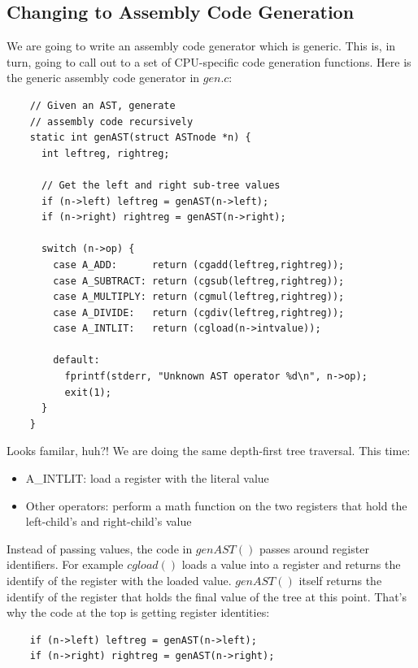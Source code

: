 \documentclass[journal, onecolumn, 12pt]{IEEEtran}
\begin{document}
\subsection{Changing to Assembly Code Generation}

We are going to write an assembly code generator which is generic. This is, in turn, going to call out to a set of CPU-specific code generation functions. Here is the generic assembly code generator in $gen.c$:

\begin{lstlisting}
    // Given an AST, generate
    // assembly code recursively
    static int genAST(struct ASTnode *n) {
      int leftreg, rightreg;
    
      // Get the left and right sub-tree values
      if (n->left) leftreg = genAST(n->left);
      if (n->right) rightreg = genAST(n->right);
    
      switch (n->op) {
        case A_ADD:      return (cgadd(leftreg,rightreg));
        case A_SUBTRACT: return (cgsub(leftreg,rightreg));
        case A_MULTIPLY: return (cgmul(leftreg,rightreg));
        case A_DIVIDE:   return (cgdiv(leftreg,rightreg));
        case A_INTLIT:   return (cgload(n->intvalue));
    
        default:
          fprintf(stderr, "Unknown AST operator %d\n", n->op);
          exit(1);
      }
    }
\end{lstlisting}

Looks familar, huh?! We are doing the same depth-first tree traversal.
This time:

\begin{itemize}
  \item A\_INTLIT: load a register with the literal value
  \item Other operators: perform a math function on the two registers that hold the left-child's and right-child's value
\end{itemize}

Instead of passing values, the code in $genAST()$ passes around register identifiers. For example $cgload()$ loads a value into a register and returns the identify of the register with the loaded value. $genAST()$ itself returns the identify of the register that holds the final value of the tree at this point. That's why the code at the top is getting register identities:

\begin{lstlisting}
    if (n->left) leftreg = genAST(n->left);
    if (n->right) rightreg = genAST(n->right);
\end{lstlisting}
\end{document}
